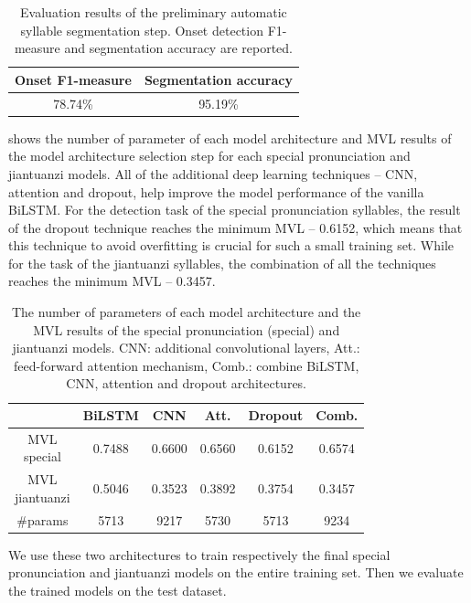 \begin{table}[ht!]
\centering
\caption{Evaluation results of the preliminary automatic syllable segmentation step. Onset detection F1-measure and segmentation accuracy are reported.}
\label{tab:ch6:syllable_segmentation_results}
\begin{tabular}{cc}
\toprule
Onset F1-measure & Segmentation accuracy \\
\midrule
78.74\% & 95.19\% \\
\bottomrule
\end{tabular}
\end{table}

 shows the number of parameter of each model architecture and \gls{MVL} results of the model architecture selection step for each special pronunciation and \gls{jiantuanzi} models. All of the additional deep learning techniques -- \gls{CNN}, attention and dropout, help improve the model performance of the vanilla \gls{BiLSTM}. For the detection task of the special pronunciation syllables, the result of the dropout technique reaches the minimum \gls{MVL} -- 0.6152, which means that this technique to avoid overfitting is crucial for such a small training set. While for the task of the \gls{jiantuanzi} syllables, the combination of all the techniques reaches the minimum \gls{MVL} -- 0.3457.  

\begin{table}[ht!]
\centering
\caption{The number of parameters of each model architecture and the MVL results of the special pronunciation (special) and jiantuanzi models. CNN: additional convolutional layers, Att.: feed-forward attention mechanism, Comb.: combine \gls{BiLSTM}, CNN, attention and dropout architectures.}
\label{tab:ch6:results_discriminative_val}
\begin{tabular}{cccccc}
\toprule
& BiLSTM & CNN & Att. & Dropout & Comb. \\
\midrule
\makecell{MVL\\special} & 0.7488 & 0.6600 & 0.6560 & 0.6152 & 0.6574 \\
\makecell{MVL\\jiantuanzi} & 0.5046 & 0.3523 & 0.3892 & 0.3754 & 0.3457 \\
\#params & 5713 & 9217 & 5730 & 5713 & 9234 \\
\bottomrule
\end{tabular}
\end{table}

We use these two architectures to train respectively the final special pronunciation and \gls{jiantuanzi} models on the entire training set. Then we evaluate the trained models on the test dataset.

